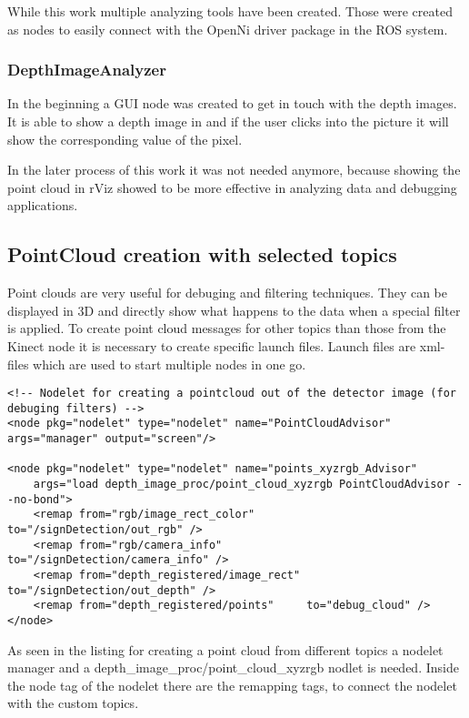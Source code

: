 While this work multiple analyzing tools have been created. Those were created as
nodes to easily connect with the OpenNi driver package in the ROS system.

\subsubsection{DepthImageAnalyzer}
In the beginning a GUI node was created to get in touch with the depth images.
It is able to show a depth image in and if the user clicks into the picture it
will show the corresponding value of the pixel.


In the later process of this work it was not needed anymore, because showing the point cloud
in rViz showed to be more effective in analyzing data and debugging applications.

\subsection{PointCloud creation with selected topics}
Point clouds are very useful for debuging and filtering techniques. They can be displayed in
3D and directly show what happens to the data when a special filter is applied.
To create point cloud messages for other topics than those from the Kinect node it is necessary to
create specific launch files. Launch files are xml-files which are used to start multiple nodes in one
go. 


{%
\tiny{}
\begin{lstlisting}
<!-- Nodelet for creating a pointcloud out of the detector image (for debuging filters) -->
<node pkg="nodelet" type="nodelet" name="PointCloudAdvisor" args="manager" output="screen"/>

<node pkg="nodelet" type="nodelet" name="points_xyzrgb_Advisor" 
	args="load depth_image_proc/point_cloud_xyzrgb PointCloudAdvisor --no-bond">
    <remap from="rgb/image_rect_color"        to="/signDetection/out_rgb" />
    <remap from="rgb/camera_info"             to="/signDetection/camera_info" />
    <remap from="depth_registered/image_rect" to="/signDetection/out_depth" />
    <remap from="depth_registered/points"     to="debug_cloud" />
</node>
\end{lstlisting}
}


As seen in the listing for creating a point cloud from different topics a nodelet manager and a 
depth\_image\_proc/point\_cloud\_xyzrgb nodlet is needed. Inside the node tag of the nodelet
there are the remapping tags, to connect the nodelet with the custom topics.

